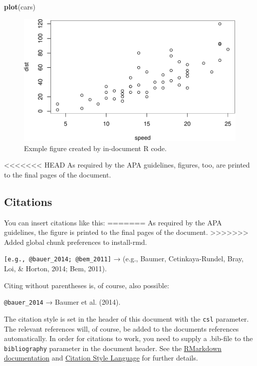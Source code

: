 \documentclass[american,man]{apa6}
\newenvironment{Shaded}{\begin{snugshade}}{\end{snugshade}}
\newcommand{\KeywordTok}[1]{\textcolor[rgb]{0.13,0.29,0.53}{\textbf{{#1}}}}
\newcommand{\NormalTok}[1]{{#1}}
\begin{document}
\begin{Shaded}
\begin{Highlighting}[]
\KeywordTok{plot}\NormalTok{(cars)}
\end{Highlighting}
\end{Shaded}

\begin{figure}[htbp]
\centering
\includegraphics{./example_files/figure-latex/unnamed-chunk-3.pdf}
\caption{Exmple figure created by in-document R code.}
\end{figure}

<<<<<<< HEAD
As required by the APA guidelines, figures, too, are printed to the
final pages of the document.

\subsection{Citations}\label{citations}

You can insert citations like this:
=======
As required by the APA guidelines, the figure is printed to the final
pages of the document.
>>>>>>> Added global chunk preferences to install-rmd.

\texttt{{[}e.g., @bauer\_2014; @bem\_2011{]}} → (e.g., {Baumer},
{Cetinkaya-Rundel}, {Bray}, {Loi}, \& {Horton}, 2014; Bem, 2011).

Citing without parentheses is, of course, also possible:

\texttt{@bauer\_2014} → {Baumer} et al. (2014).

The citation style is set in the header of this document with the
\texttt{csl} parameter. The relevant references will, of course, be
added to the documents references automatically. In order for citations
to work, you need to supply a .bib-file to the \texttt{bibliography}
parameter in the document header. See the
\href{http://rmarkdown.rstudio.com/authoring_bibliographies_and_citations.html}{RMarkdown
documentation} and \href{http://citationstyles.org/}{Citation Style
Language} for further details.
\end{document}
